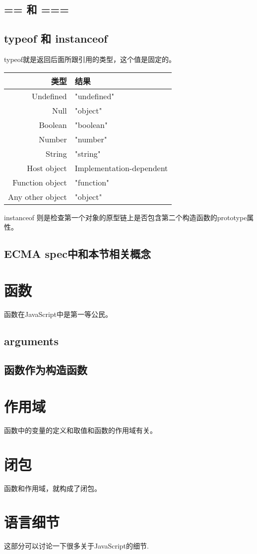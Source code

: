 \subsection{== 和 ===}
\subsection{typeof 和 instanceof}
typeof就是返回后面所跟引用的类型，这个值是固定的。

\begin{tabular}{|r|l|}
		\hline
		类型	& 	结果\\
		\hline
		Undefined 	& 	"undefined"\\
		\hline
		Null		&	"object"\\
		\hline
		Boolean		&	"boolean"\\
		\hline
		Number		&	"number"\\
		\hline
		String		&	"string"\\
		\hline
		Host object & Implementation-dependent\\
		\hline
		Function object & "function"\\
		\hline
		Any other object &	"object"\\
		\hline
\end{tabular}

	instanceof 则是检查第一个对象的原型链上是否包含第二个构造函数的prototype属性。

	
\subsection{ECMA spec中和本节相关概念}

\section{函数}
函数在JavaScript中是第一等公民。

	
\subsection{arguments}
\subsection{函数作为构造函数}	
	
\section{作用域}
	函数中的变量的定义和取值和函数的作用域有关。
\section{闭包}
	函数和作用域，就构成了闭包。
\section{语言细节}
	这部分可以讨论一下很多关于JavaScript的细节.